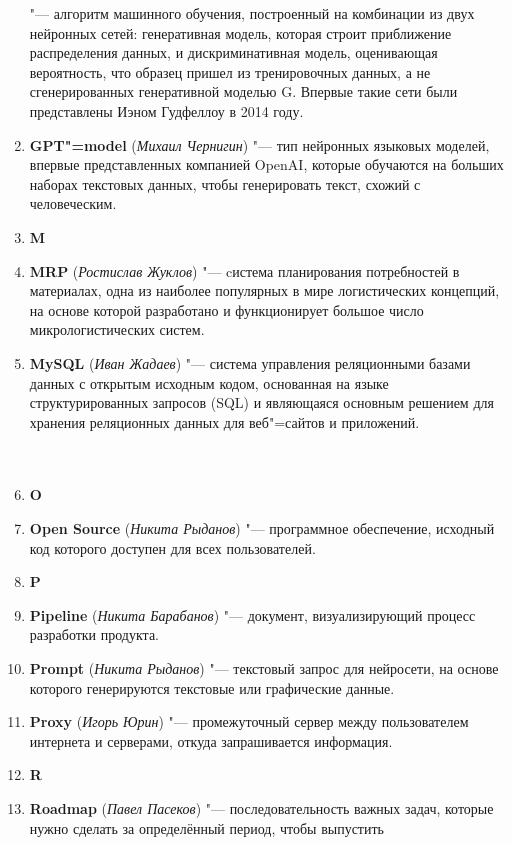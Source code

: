 \documentclass[a4paper, 14 pt]{extarticle}
\begin{document}
\begin{enumerate}
    "--- алгоритм машинного обучения, построенный на комбинации из двух 
    нейронных сетей: генеративная модель, которая строит приближение 
    распределения данных, и дискриминативная модель, оценивающая вероятность, 
    что образец пришел из тренировочных данных, а не сгенерированных 
    генеративной моделью G. Впервые такие сети были представлены Иэном Гудфеллоу
    в 2014 году.
    \item \textbf{GPT"=model} (\textit{Михаил Чернигин}) "--- тип нейронных
    языковых моделей, впервые представленных компанией OpenAI, которые обучаются
    на больших наборах текстовых данных, чтобы генерировать текст, схожий с 
    человеческим.
    \item[] \textbf{M}
    \item \textbf{MRP} (\textit{Ростислав Жуклов}) "--- cистема планирования 
    потребностей в материалах, одна из наиболее популярных в мире логистических 
    концепций, на основе которой разработано и функционирует большое число 
    микрологистических систем.
    \item \textbf{MySQL} (\textit{Иван Жадаев}) "--- система управления 
    реляционными базами данных с открытым исходным кодом, основанная на языке 
    структурированных запросов (SQL) и являющаяся основным решением для хранения 
    реляционных данных для веб"=сайтов и приложений. \\
    \\
    \\
    \item[] \textbf{O}
    \item \textbf{Open Source} (\textit{Никита Рыданов}) "--- программное 
    обеспечение, исходный код которого доступен для всех пользователей.
    \item[] \textbf{P}
    \item \textbf{Pipeline} (\textit{Никита Барабанов}) "--- документ, 
    визуализирующий процесс разработки продукта. 
    \item \textbf{Prompt} (\textit{Никита Рыданов}) "--- текстовый запрос для 
    нейросети, на основе которого генерируются текстовые или графические данные.
    \item \textbf{Proxy} (\textit{Игорь Юрин}) "--- промежуточный сервер между 
    пользователем интернета и серверами, откуда запрашивается информация. 
    \item[] \textbf{R}
    \item \textbf{Roadmap} (\textit{Павел Пасеков}) "--- последовательность 
    важных задач, которые нужно сделать за определённый период, чтобы выпустить 

\end{enumerate}
\end{document}

